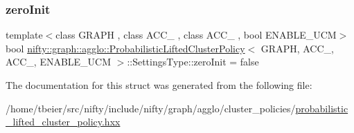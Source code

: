 \mbox{\label{structnifty_1_1graph_1_1agglo_1_1ProbabilisticLiftedClusterPolicy_1_1SettingsType_af97a6730de6b6914aa69202c046656ae}} 
\subsubsection{\texorpdfstring{zero\+Init}{zeroInit}}
{\footnotesize\ttfamily template$<$class G\+R\+A\+PH , class A\+C\+C\+\_ , class A\+C\+C\+\_ , bool E\+N\+A\+B\+L\+E\+\_\+\+U\+CM$>$ \\
bool \hyperlink{classnifty_1_1graph_1_1agglo_1_1ProbabilisticLiftedClusterPolicy}{nifty\+::graph\+::agglo\+::\+Probabilistic\+Lifted\+Cluster\+Policy}$<$ G\+R\+A\+PH, A\+C\+C\+\_, A\+C\+C\+\_, E\+N\+A\+B\+L\+E\+\_\+\+U\+CM $>$\+::Settings\+Type\+::zero\+Init = false}



The documentation for this struct was generated from the following file\+:\begin{DoxyCompactItemize}
\item 
/home/tbeier/src/nifty/include/nifty/graph/agglo/cluster\+\_\+policies/\hyperlink{probabilistic__lifted__cluster__policy_8hxx}{probabilistic\+\_\+lifted\+\_\+cluster\+\_\+policy.\+hxx}\end{DoxyCompactItemize}
